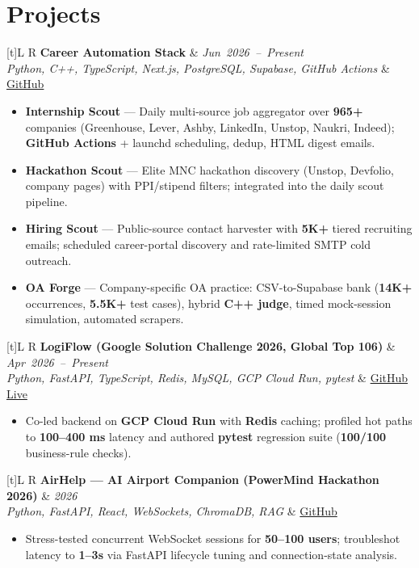 \documentclass[a4paper,10pt]{article}
\newcommand{\resumeDate}[1]{\mbox{\small\textit{#1}}}
\newcommand{\resumeProject}[4]{
  \vspace{1.5mm}
  \noindent
  \begin{tabularx}{\textwidth}[t]{L R}
    \textbf{#1} & \resumeDate{#3} \\
    \small\textit{#2} & \small #4 \\
  \end{tabularx}
  \vspace{0.5mm}
}
\newcommand{\resumeItemListStart}{\begin{itemize}[leftmargin=*, topsep=2pt, itemsep=1.5pt, parsep=0pt, partopsep=0pt]}
\newcommand{\resumeItemListEnd}{\end{itemize}\vspace{0.5mm}}
\begin{document}
\section{Projects}
\small

\resumeProject
  {Career Automation Stack}
  {Python, C++, TypeScript, Next.js, PostgreSQL, Supabase, GitHub Actions}
  {Jun 2026 -- Present}
  {\href{https://github.com/Ojas-Srivastava05/resume-optimiser}{GitHub}}
\resumeItemListStart
  \item \textbf{Internship Scout} --- Daily multi-source job aggregator over \textbf{965+} companies (Greenhouse, Lever, Ashby, LinkedIn, Unstop, Naukri, Indeed); \textbf{GitHub Actions} + launchd scheduling, dedup, HTML digest emails.
  \item \textbf{Hackathon Scout} --- Elite MNC hackathon discovery (Unstop, Devfolio, company pages) with PPI/stipend filters; integrated into the daily scout pipeline.
  \item \textbf{Hiring Scout} --- Public-source contact harvester with \textbf{5K+} tiered recruiting emails; scheduled career-portal discovery and rate-limited SMTP cold outreach.
  \item \textbf{OA Forge} --- Company-specific OA practice: CSV-to-Supabase bank (\textbf{14K+} occurrences, \textbf{5.5K+} test cases), hybrid \textbf{C++ judge}, timed mock-session simulation, automated scrapers.
\resumeItemListEnd

\resumeProject
  {LogiFlow (Google Solution Challenge 2026, Global Top 106)}
  {Python, FastAPI, TypeScript, Redis, MySQL, GCP Cloud Run, pytest}
  {Apr 2026 -- Present}
  {\href{https://github.com/Ojas-Srivastava05/LogiFlow-Solution-Challenge-2026}{GitHub} \textbar{} \href{https://logi-flow-solution-challenge-2026.vercel.app/}{Live}}
\resumeItemListStart
  \item Co-led backend on \textbf{GCP Cloud Run} with \textbf{Redis} caching; profiled hot paths to \textbf{100--400 ms} latency and authored \textbf{pytest} regression suite (\textbf{100/100} business-rule checks).
\resumeItemListEnd

\resumeProject
  {AirHelp --- AI Airport Companion (PowerMind Hackathon 2026)}
  {Python, FastAPI, React, WebSockets, ChromaDB, RAG}
  {2026}
  {\href{https://github.com/Ojas-Srivastava05/AirHelp-AI-Airport-Assistant}{GitHub}}
\resumeItemListStart
  \item Stress-tested concurrent WebSocket sessions for \textbf{50--100 users}; troubleshot latency to \textbf{1--3s} via FastAPI lifecycle tuning and connection-state analysis.
\resumeItemListEnd
\end{document}
